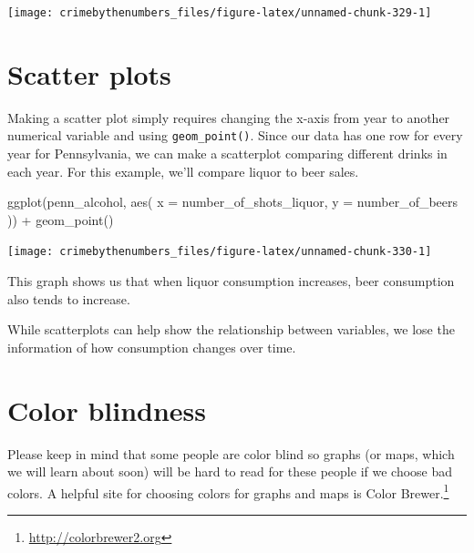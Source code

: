 \documentclass[
  a4paper,
]{krantz}
\makeatletter
\newenvironment{Shaded}{\begin{snugshade}}{\end{snugshade}}
\newcommand{\AttributeTok}[1]{\textcolor[rgb]{0.61,0.61,0.61}{#1}}
\newcommand{\FunctionTok}[1]{\textcolor[rgb]{0,0,0}{#1}}
\newcommand{\NormalTok}[1]{#1}
\newcommand{\SpecialCharTok}[1]{\textcolor[rgb]{0,0,0}{#1}}
\renewcommand{\href}[2]{#2\footnote{\url{#1}}}
\newenvironment{kframe}{%
\medskip{}
\setlength{\fboxsep}{.8em}
 \def\at@end@of@kframe{}%
 \ifinner\ifhmode%
  \def\at@end@of@kframe{\end{minipage}}%
  \begin{minipage}{\columnwidth}%
 \fi\fi%
 \def\FrameCommand##1{\hskip\@totalleftmargin \hskip-\fboxsep
 \colorbox{shadecolor}{##1}\hskip-\fboxsep
     \hskip-\linewidth \hskip-\@totalleftmargin \hskip\columnwidth}%
 \MakeFramed {\advance\hsize-\width
   \@totalleftmargin\z@ \linewidth\hsize
   \@setminipage}}%
 {\par\unskip\endMakeFramed%
 \at@end@of@kframe}
\renewenvironment{Shaded}{\begin{kframe}}{\end{kframe}}
\makeatother
\begin{document}
\begin{center}\texttt{[image: crimebythenumbers\_files/figure-latex/unnamed-chunk-329-1]} \end{center}

\hypertarget{scatter-plots}{%
\section{Scatter plots}\label{scatter-plots}}

Making a scatter plot simply requires changing the x-axis
from year to another numerical variable and using
\texttt{geom\_point()}. Since our data has one row for every
year for Pennsylvania, we can make a scatterplot comparing
different drinks in each year. For this example, we'll
compare liquor to beer sales.

\begin{Shaded}
\begin{Highlighting}[]
\FunctionTok{ggplot}\NormalTok{(penn\_alcohol, }\FunctionTok{aes}\NormalTok{(}
  \AttributeTok{x =}\NormalTok{ number\_of\_shots\_liquor,}
  \AttributeTok{y =}\NormalTok{ number\_of\_beers}
\NormalTok{)) }\SpecialCharTok{+}
  \FunctionTok{geom\_point}\NormalTok{()}
\end{Highlighting}
\end{Shaded}

\begin{center}\texttt{[image: crimebythenumbers\_files/figure-latex/unnamed-chunk-330-1]} \end{center}

This graph shows us that when liquor consumption increases,
beer consumption also tends to increase.

While scatterplots can help show the relationship between
variables, we lose the information of how consumption
changes over time.

\hypertarget{color-blindness}{%
\section{Color blindness}\label{color-blindness}}

Please keep in mind that some people are color blind so
graphs (or maps, which we will learn about soon) will be
hard to read for these people if we choose bad colors. A
helpful site for choosing colors for graphs and maps is
\href{http://colorbrewer2.org}{Color Brewer.}
\end{document}
